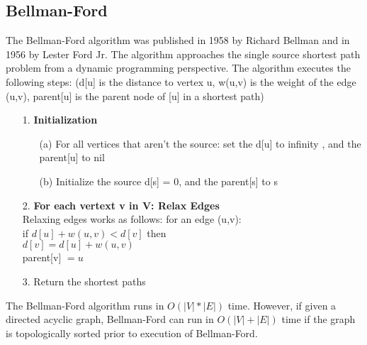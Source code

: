 \documentclass{article}
\begin{document}
    \subsection*{Bellman-Ford}
    The Bellman-Ford algorithm was published in 1958 by Richard Bellman and in 1956 by Lester Ford Jr. The algorithm approaches the single source shortest path problem from a dynamic programming perspective. The algorithm executes the following steps: (d[u] is the distance to vertex u, w(u,v) is the weight of the edge (u,v), parent[u] is the parent node of [u] in a shortest path)
    \begin{enumerate}
      \item[1.] \textbf{Initialization}
        \begin{enumerate}
        \item[(a)] For all vertices that aren't the source: set the d[u] to infinity , and the parent[u] to nil
        \item[(b)] Initialize the source d[s] = 0, and the parent[s] to s
        \end{enumerate}
      \item[2.] \textbf{For each vertext v in V: Relax Edges}\\
        Relaxing edges works as follows: for an edge (u,v):\\
         if $d[u] + w(u,v) < d[v]$ then\\
            $d[v] = d[u] + w(u,v)$\\
            parent[v] $= u$
      \item[3.] Return the shortest paths
    \end{enumerate}
    The Bellman-Ford algorithm runs in $O(|V| * |E|)$ time. However, if given a directed acyclic graph, Bellman-Ford can run in $O(|V| + |E|)$ time if the graph is topologically sorted prior to execution of Bellman-Ford.
\end{document}
